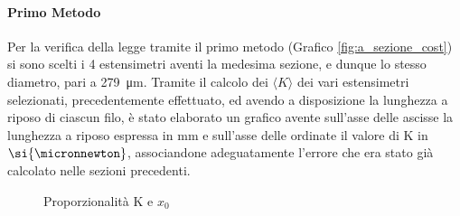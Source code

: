 \documentclass[a4paper,11pt,oneside]{article}
\begin{document}
\paragraph{Primo Metodo}
Per la verifica della legge tramite il primo metodo (Grafico \ref{fig:a_sezione_cost}) si sono scelti i 4  estensimetri aventi la medesima sezione, e dunque lo stesso diametro, pari a \SI{279}{\micro\meter}. Tramite il calcolo dei $\langle K \rangle$ dei vari estensimetri selezionati, precedentemente effettuato, ed avendo a disposizione la lunghezza a riposo di ciascun filo, è stato elaborato un grafico avente sull'asse delle ascisse la lunghezza a riposo espressa in $\si{\milli\meter}$ e sull'asse delle ordinate il valore di K in $\si{\micronnewton}$, associandone adeguatamente l'errore che era stato già calcolato nelle sezioni precedenti.

\begin{figure}[h!]
    \centering
    \caption{Proporzionalità K e $x_{0}$}
\end{figure}
\end{document}
